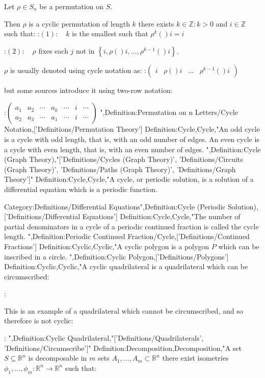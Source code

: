Let $\rho \in S_n$ be a permutation on $S$.


Then $\rho$ is a cyclic permutation of length $k$  there exists $k \in \mathbb Z: k > 0$ and $i \in \mathbb Z$ such that:
:$(1): \quad k$ is the smallest such that $\rho^k \left(   \right)i = i$

:$(2): \quad \rho$ fixes each $j$ not in $\left\lbrace i, \rho \left(   \right)i, \ldots, \rho^{k - 1}  \left(   \right)i \right\rbrace$.


$\rho$ is usually denoted using cycle notation as:
:$\begin{pmatrix} i & \rho \left(   \right)i & \ldots & \rho^{k - 1}  \left(   \right)i \end{pmatrix}$

but some sources introduce it using two-row notation:

:$\begin{pmatrix} a_1 & a_2 & \cdots & a_k & \cdots & i & \cdots \\ a_2 & a_3 & \cdots & a_1 & \cdots & i & \cdots \end{pmatrix}$
",Definition:Permutation on n Letters/Cycle Notation,['Definitions/Permutation Theory']
Definition:Cycle,Cycle,"An odd cycle is a cycle with odd length, that is, with an odd number of edges.
An even cycle is a cycle with even length, that is, with an even number of edges.
",Definition:Cycle (Graph Theory),"['Definitions/Cycles (Graph Theory)', 'Definitions/Circuits (Graph Theory)', 'Definitions/Paths (Graph Theory)', 'Definitions/Graph Theory']"
Definition:Cycle,Cycle,"A cycle, or periodic solution, is a solution of a differential equation which is a periodic function.

Category:Definitions/Differential Equations",Definition:Cycle (Periodic Solution),['Definitions/Differential Equations']
Definition:Cycle,Cycle,"The number of partial denominators in a cycle of a periodic continued fraction is called the cycle length.
",Definition:Periodic Continued Fraction/Cycle,['Definitions/Continued Fractions']
Definition:Cyclic,Cyclic,"A cyclic polygon is a polygon $P$ which can be inscribed in a circle.
",Definition:Cyclic Polygon,['Definitions/Polygons']
Definition:Cyclic,Cyclic,"A cyclic quadrilateral is a quadrilateral which can be circumscribed:

:


This is an example of a quadrilateral which cannot be circumscribed, and so therefore is not cyclic:

:
",Definition:Cyclic Quadrilateral,"['Definitions/Quadrilaterals', 'Definitions/Circumscribe']"
Definition:Decomposition,Decomposition,"A set $S \subseteq \mathbb R^n$ is decomposable in $m$ sets $A_1, \ldots, A_m \subset \mathbb R^n$  there exist isometries $\phi_1, \ldots, \phi_m: \mathbb R^n \to \mathbb R^n$ such that:

